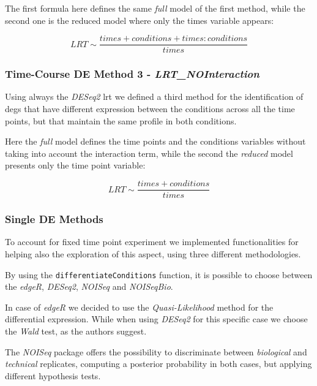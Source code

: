 The first formula here defines the same \textit{full} model of the first method, while the second one is the reduced model where only the times variable appears:

\[LRT \sim \frac{times+conditions+times:conditions}{times}\]


\subsubsection{Time-Course DE Method 3 - \textit{LRT\_NOInteraction}}
Using always the \textit{DESeq2} \gls{lrt} we defined a third method for the 
identification of \glspl{deg} that have different expression between the conditions across all the time points, but that maintain the same profile in both conditions.

Here the \textit{full} model defines the time points and the conditions variables without taking into account the interaction term, while the second the \textit{reduced} model presents only the time point variable:

\[LRT \sim \frac{times+conditions}{times}\]


%


\subsubsection{Single DE Methods}

To account for fixed time point experiment we implemented functionalities for helping also the exploration of this aspect, using three different methodologies.
 

By using the \lstinline!differentiateConditions! function, it is possible to choose between the \textit{edgeR}, \textit{DESeq2}, \textit{NOISeq} and \textit{NOISeqBio}.

In case of \textit{edgeR} we decided to use the \textit{Quasi-Likelihood} method for the differential expression.
While when using \textit{DESeq2} for this specific case we choose the \textit{Wald} test, as the authors suggest.

The \textit{NOISeq} package offers the possibility to discriminate between \textit{biological} and \textit{technical} replicates, computing a posterior probability in both cases, but applying different hypothesis tests.




